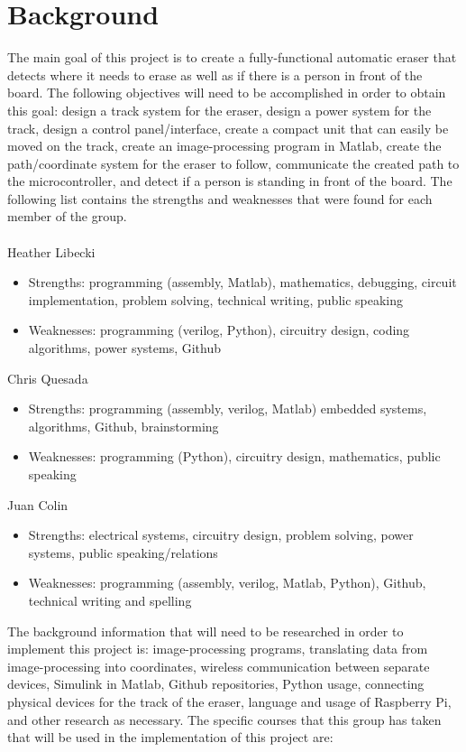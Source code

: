 \documentclass{IEEEtran}					%
\begin{document}
	\section{Background}
	The main goal of this project is to create a fully-functional automatic eraser that detects where it needs to erase as well as if there is a person in front of the board. The following objectives will need to be accomplished in order to obtain this goal: design a track system for the eraser, design a power system for the track, design a control panel/interface, create a compact unit that can easily be moved on the track, create an image-processing program in Matlab, create the path/coordinate system for the eraser to follow, communicate the created path to the microcontroller, and detect if a person is standing in front of the board.
	The following list contains the strengths and weaknesses that were found for each member of the group.\\\\
	Heather Libecki
	\begin{itemize}
		\item Strengths: programming (assembly, Matlab), mathematics, debugging, circuit implementation, problem solving, technical writing, public speaking
	 	\item Weaknesses: programming (verilog, Python), circuitry design, coding algorithms, power systems, Github
 	\end{itemize}
 	Chris Quesada
	\begin{itemize}
		\item Strengths: programming (assembly, verilog, Matlab) embedded systems, algorithms, Github, brainstorming
		\item Weaknesses: programming (Python), circuitry design, mathematics, public speaking
	\end{itemize}
	Juan Colin
	\begin{itemize}
		\item Strengths: electrical systems, circuitry design, problem solving, power systems, public speaking/relations
		\item Weaknesses: programming (assembly, verilog, Matlab, Python), Github, technical writing and spelling \\
	\end{itemize} 
	\par
	\setlength{\parindent}{5ex} 
	The background information that will need to be researched in order to implement this project is: image-processing programs, translating data from image-processing into coordinates, wireless communication between separate devices, Simulink in Matlab, Github repositories, Python usage, connecting physical devices for the track of the eraser, language and usage of Raspberry Pi, and other research as necessary. The specific courses that this group has taken that will be used in the implementation of this project are: 
\end{document}
